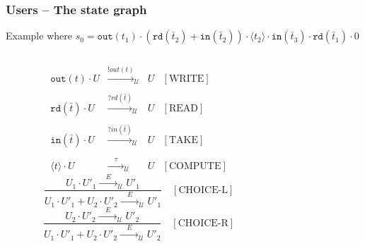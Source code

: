 \documentclass[presentation]{beamer}\mode<presentation>{\usetheme{AMSCesenaPurpleAndGold}}
\begin{document}
\begin{frame}
\frametitle{Users -- The state graph}
    
    Example where \alert{$s_0 = \mathtt{out}(t_1) \cdot (\mathtt{rd}(\bar{t}_2) + \mathtt{in}(\bar{t}_2)) \cdot \langle t_2 \rangle \cdot \mathtt{in}(\bar{t}_3) \cdot \mathtt{rd}(\bar{t}_1) \cdot 0$}

    \begin{columns}
        \begin{column}{.70\linewidth}
            \small
            \[\begin{array}{rclr}
                \mathtt{out}(t) \cdot U &\xrightarrow{!out(t)}_\mathcal{U}& U & [\text{WRITE}] \\
                \\
                \mathtt{rd}(\bar t) \cdot U &\xrightarrow{?rd(\bar t)}_\mathcal{U}& U & [\text{READ}] \\
                \\
                \mathtt{in}(\bar t) \cdot U &\xrightarrow{?in(\bar t)}_\mathcal{U}& U & [\text{TAKE}] \\
                \\
                \langle t \rangle \cdot U &\xrightarrow{\phantom{ab}\tau\phantom{ab}}_\mathcal{U}& U & [\text{COMPUTE}]
            \end{array}\]
            \[
                \frac{U_1 \cdot U'_1 \xrightarrow{\phantom{ab}E\phantom{ab}}_\mathcal{U} U'_1}{U_1 \cdot U'_1 + U_2 \cdot U'_2 \xrightarrow{\phantom{ab}E\phantom{ab}}_\mathcal{U} U'_1} \quad [\text{CHOICE-L}]
            \]
            \[
                \frac{U_2 \cdot U'_2 \xrightarrow{\phantom{ab}E\phantom{ab}}_\mathcal{U} U'_2}{U_1 \cdot U'_1 + U_2 \cdot U'_2 \xrightarrow{\phantom{ab}E\phantom{ab}}_\mathcal{U} U'_2} \quad [\text{CHOICE-R}]
            \]
        \end{column}
        \begin{column}{.30\linewidth}

\end{column}
\end{columns}
\end{frame}
\end{document}
